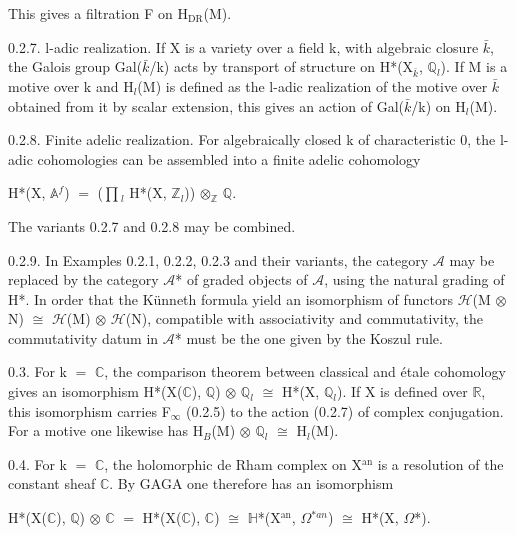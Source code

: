 \documentclass[10pt,twoside]{article}
\begin{document}
This gives a filtration F on H\ensuremath{_{\mathrm{DR}}}(M).\par
0.2.7. l-adic realization. If X is a variety over a field k, with algebraic closure \ensuremath{\bar{k}}, the Galois group Gal(\ensuremath{\bar{k}}/k) acts by transport of structure on H*(X\ensuremath{_{\bar{k}}}, \ensuremath{ℚ}\ensuremath{_{l}}). If M is a motive over k and H\ensuremath{_{l}}(M) is defined as the l-adic realization of the motive over \ensuremath{\bar{k}} obtained from it by scalar extension, this gives an action of Gal(\ensuremath{\bar{k}}/k) on H\ensuremath{_{l}}(M).\par
0.2.8. Finite adelic realization. For algebraically closed k of characteristic 0, the l-adic cohomologies can be assembled into a finite adelic cohomology\par
H*(X, \ensuremath{𝔸}\ensuremath{^{f}}) \ensuremath{=} (\ensuremath{∏}\ensuremath{_{l}} H*(X, \ensuremath{ℤ}\ensuremath{_{l}})) \ensuremath{⊗}\ensuremath{_{ℤ}} \ensuremath{ℚ}.\par
The variants 0.2.7 and 0.2.8 may be combined.\par
0.2.9. In Examples 0.2.1, 0.2.2, 0.2.3 and their variants, the category \ensuremath{𝒜} may be replaced by the category \ensuremath{𝒜}* of graded objects of \ensuremath{𝒜}, using the natural grading of H*. In order that the Künneth formula yield an isomorphism of functors \ensuremath{ℋ}(M \ensuremath{⊗} N) \ensuremath{≅} \ensuremath{ℋ}(M) \ensuremath{⊗} \ensuremath{ℋ}(N), compatible with associativity and commutativity, the commutativity datum in \ensuremath{𝒜}* must be the one given by the Koszul rule.\par
0.3. For k \ensuremath{=} \ensuremath{ℂ}, the comparison theorem between classical and étale cohomology gives an isomorphism H*(X(\ensuremath{ℂ}), \ensuremath{ℚ}) \ensuremath{⊗} \ensuremath{ℚ}\ensuremath{_{l}} \ensuremath{≅} H*(X, \ensuremath{ℚ}\ensuremath{_{l}}). If X is defined over \ensuremath{ℝ}, this isomorphism carries F\ensuremath{_{∞}} (0.2.5) to the action (0.2.7) of complex conjugation. For a motive one likewise has H\ensuremath{_{B}}(M) \ensuremath{⊗} \ensuremath{ℚ}\ensuremath{_{l}} \ensuremath{≅} H\ensuremath{_{l}}(M).\par
0.4. For k \ensuremath{=} \ensuremath{ℂ}, the holomorphic de Rham complex on X\ensuremath{^{\mathrm{an}}} is a resolution of the constant sheaf \ensuremath{ℂ}. By GAGA one therefore has an isomorphism\par
H*(X(\ensuremath{ℂ}), \ensuremath{ℚ}) \ensuremath{⊗} \ensuremath{ℂ} \ensuremath{=} H*(X(\ensuremath{ℂ}), \ensuremath{ℂ}) \ensuremath{≅} \ensuremath{ℍ}*(X\ensuremath{^{\mathrm{an}}}, \ensuremath{Ω}\ensuremath{^{*an}}) \ensuremath{≅} H*(X, \ensuremath{Ω}*).\par
\end{document}
